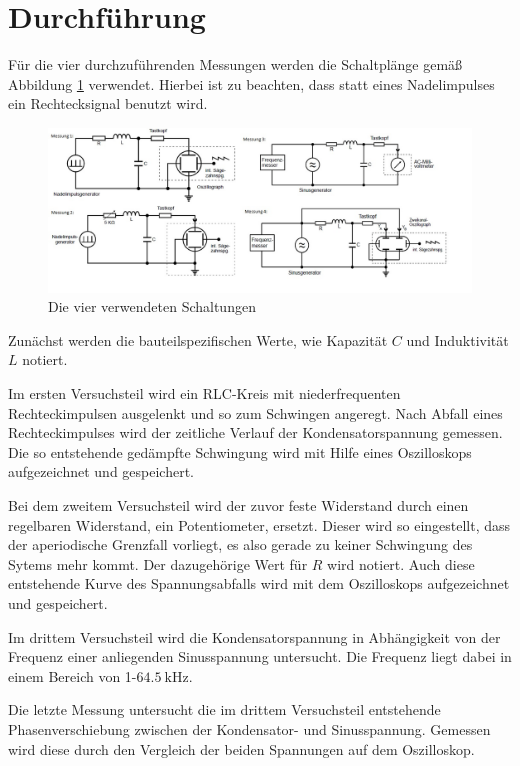 \section{Durchführung}
\label{sec:Durchführung}

Für die vier durchzuführenden Messungen werden die Schaltplänge gemäß
Abbildung \ref{fig:Aufbau} verwendet. Hierbei ist zu beachten, dass statt eines 
Nadelimpulses ein Rechtecksignal benutzt wird. 

\begin{figure}
  \centering
  \includegraphics[scale=0.4]{content/Aufbau_Schaltungen.jpg}
  \caption{Die vier verwendeten Schaltungen}
  \label{fig:Aufbau}
\end{figure}

Zunächst werden die bauteilspezifischen Werte, wie Kapazität $C$
und Induktivität $L$ notiert. 

Im ersten Versuchsteil wird ein RLC-Kreis mit niederfrequenten 
Rechteckimpulsen ausgelenkt und so zum Schwingen angeregt. Nach Abfall
eines Rechteckimpulses wird der zeitliche Verlauf der Kondensatorspannung
gemessen. Die so entstehende gedämpfte Schwingung wird mit Hilfe eines
Oszilloskops aufgezeichnet und gespeichert. 

Bei dem zweitem Versuchsteil wird der zuvor feste Widerstand durch einen 
regelbaren Widerstand, ein Potentiometer, ersetzt. Dieser wird so eingestellt, 
dass der aperiodische Grenzfall vorliegt, es also gerade zu keiner Schwingung des 
Sytems mehr kommt. Der dazugehörige Wert für $R$ wird notiert. Auch diese 
entstehende Kurve des Spannungsabfalls wird mit dem Oszilloskops aufgezeichnet 
und gespeichert. 

Im drittem Versuchsteil wird die Kondensatorspannung in Abhängigkeit von 
der Frequenz einer anliegenden Sinusspannung untersucht. Die Frequenz
liegt dabei in einem Bereich von 1-$\SI{64.5}{\kilo\hertz}$. 

Die letzte Messung untersucht die im drittem Versuchsteil entstehende 
Phasenverschiebung zwischen der Kondensator- und Sinusspannung. Gemessen 
wird diese durch den Vergleich der beiden Spannungen auf dem Oszilloskop. 


